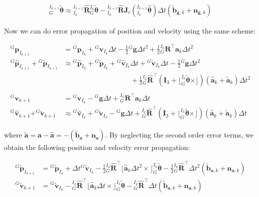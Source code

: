 \begin{align*} \text{}^{I_{k+1}}_{G}\tilde{\boldsymbol{\theta}} \approx \text{}^{I_{k+1}}_{I_{k}}\hat{\mathbf{R}} \text{}^{I_k}_{G}\tilde{\boldsymbol{\theta}} - \text{}^{I_{k+1}}_{I_{k}}\hat{\mathbf{R}}\mathbf J_r(\text{}^{I_{k+1}}_{I_{k}}\hat{\boldsymbol{\theta}}) \Delta t (\tilde{\mathbf{b}}_{\mathbf{g},k} + \mathbf{n}_{\mathbf{g},k}) \end{align*}

Now we can do error propagation of position and velocity using the same scheme\+:

\begin{align*} ^G\mathbf{p}_{I_{k+1}} &= \text{}^G\mathbf{p}_{I_k} + \text{}^G\mathbf{v}_{I_k} \Delta t - \frac{1}{2}{}^G\mathbf{g}\Delta t^2 + \frac{1}{2}\text{}^{I_k}_G\mathbf{R}^\top \mathbf{a}_{k}\Delta t^2\\ ^G\hat{\mathbf{p}}_{I_{k+1}} + \text{}^G\tilde{\mathbf{p}}_{I_{k+1}} &\approx \text{}^G\hat{\mathbf{p}}_{I_k} + \text{}^G\tilde{\mathbf{p}}_{I_k} + \text{}^G\hat{\mathbf{v}}_{I_k} \Delta t + \text{}^G\tilde{\mathbf{v}}_{I_k} \Delta t - \frac{1}{2}{}^G\mathbf{g}\Delta t^2\\ &\hspace{4cm} + \frac{1}{2} \text{}^{I_k}_{G}\hat{\mathbf{R}}^\top (\mathbf{I}_3 + \lfloor ^{I_{k}}_{G}\tilde{\boldsymbol{\theta}}\times\rfloor) (\hat{\mathbf{a}}_{k} + \tilde{\mathbf{a}}_{k})\Delta t^2\\ \\ ^G\mathbf{v}_{k+1} &= \text{}^G\mathbf{v}_{I_k} - {}^G\mathbf{g}\Delta t +\text{}^{I_k}_G\mathbf{R}^\top\mathbf{a}_{k}\Delta t\\ ^G\hat{\mathbf{v}}_{k+1} + ^G\tilde{\mathbf{v}}_{k+1} &\approx {}^G\hat{\mathbf{v}}_{I_k} + {}^G\tilde{\mathbf{v}}_{I_k} - {}^G\mathbf{g}\Delta t + \text{}^{I_k}_G\hat{\mathbf{R}}^\top (\mathbf{I}_3 + \lfloor ^{I_{k}}_{G}\tilde{\boldsymbol{\theta}}\times\rfloor) (\hat{\mathbf{a}}_{k} + \tilde{\mathbf{a}}_{k})\Delta t \end{align*}

where $\tilde{\mathbf{a}} = \mathbf{a} - \hat{\mathbf{a}} = - (\tilde{\mathbf{b}}_{\mathbf{a}} + \mathbf{n}_{\mathbf{a}})$. By neglecting the second order error terms, we obtain the following position and velocity error propagation\+:

\begin{align*} \text{}^G\tilde{\mathbf{p}}_{I_{k+1}} &= \text{}^G\tilde{\mathbf{p}}_{I_k} + \Delta t \text{}^G\tilde{\mathbf{v}}_{I_k} - \frac{1}{2}\text{}^{I_k}_{G}\hat{\mathbf{R}}^\top \lfloor \hat{\mathbf{a}}_{k} \Delta t^2 \times\rfloor ^{I_{k}}_{G}\tilde{\boldsymbol{\theta}} - \frac{1}{2} \text{}^{I_k}_{G}\hat{\mathbf{R}}^\top \Delta t^2 (\tilde{\mathbf{b}}_{\mathbf{a},k} + \mathbf{n}_{\mathbf{a},k})\\ ^G\tilde{\mathbf{v}}_{k+1} &= \text{}^G\tilde{\mathbf{v}}_{I_k} - \text{}^{I_k}_G\hat{\mathbf{R}}^\top \lfloor \hat{\mathbf{a}}_{k} \Delta t \times\rfloor ^{I_{k}}_{G}\tilde{\boldsymbol{\theta}} - \text{}^{I_k}_G\hat{\mathbf{R}}^\top \Delta t (\tilde{\mathbf{b}}_{\mathbf{a},k} + \mathbf{n}_{\mathbf{a},k}) \end{align*}

